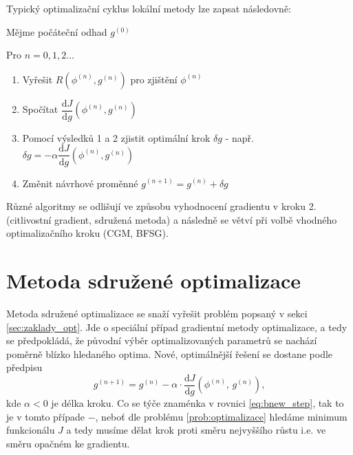 Typický optimalizační cyklus lokální metody lze zapsat následovně:
\begin{addmargin}[3em]{2em}%
	\begin{description}
	\item 	Mějme počáteční odhad $ g^{(0)} $
	\item 	Pro $ n=0,1,2... $
	 	\begin{enumerate}
			\item Vyřešit $ R(\phi^{(n)},g^{(n)}) $ pro zjištění $ \phi^{(n)} $
			\item Spočítat $ \dfrac{\mathrm{d}J}{\mathrm{d}g}(\phi^{(n)},g^{(n)}) $
			\item Pomocí výsledků 1 a 2 zjistit optimální krok $ \delta g $ - např. $ \delta g = -\alpha \dfrac{\mathrm{d}J}{\mathrm{d}g}(\phi^{(n)},g^{(n)}) $
			\item Změnit návrhové proměnné $ g^{(n+1)} = g^{(n)} + \delta g $
		\end{enumerate}
	\end{description}
\end{addmargin}
Různé algoritmy se odlišují ve způsobu vyhodnocení gradientu v kroku 2. (citlivostní gradient, sdružená metoda) a následně se větví při volbě vhodného optimalizačního kroku (CGM, BFSG).  

\section{Metoda sdružené optimalizace}

Metoda sdružené optimalizace se snaží vyřešit problém popsaný v sekci \ref{sec:zaklady_opt}. 
Jde o speciální případ gradientní metody optimalizace, a tedy se předpokládá, že původní výběr optimalizovaných parametrů se nachází poměrně blízko hledaného optima. Nové, optimálnější řešení se dostane podle předpisu
\begin{equation}\label{eq:bnew_step}
g^{(n+1)}=g^{(n)}-\alpha\cdot\dfrac{\mathrm{d}J}{\mathrm{d}g}(\phi^{(n)}, \, g^{(n)}),
\end{equation}
kde $ \alpha < 0 $ je délka kroku. 
Co se týče znaménka v rovnici \ref{eq:bnew_step}, tak to je v tomto případe $ - $, neboť dle problému \ref{prob:optimalizace} hledáme minimum funkcionálu $ J $ a tedy musíme dělat krok proti směru nejvyššího růstu i.e. ve směru opačném ke gradientu.

